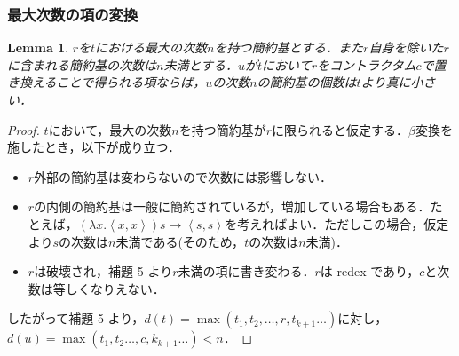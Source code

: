 \documentclass[a4paper,10pt,platex, dvipdfmx]{jsarticle}
\newtheorem{lemma}{Lemma}
\begin{document}
\subsubsection{最大次数の項の変換}
\begin{lemma}
$r$を$t$における最大の次数$n$を持つ簡約基とする．また$r$自身を除いた$r$に含まれる簡約基の次数は$n$未満とする．$u$が$t$において$r$をコントラクタム$c$で置き換えることで得られる項ならば，$u$の次数$n$の簡約基の個数は$t$より真に小さい．
\end{lemma}
\begin{proof}
    $t$において，最大の次数$n$を持つ簡約基が$r$に限られると仮定する．$\beta$変換を施したとき，以下が成り立つ．
    \begin{itemize}    
    \item $r$外部の簡約基は変わらないので次数には影響しない．
    \item $r$の内側の簡約基は一般に簡約されているが，増加している場合もある．たとえば，$(\lambda x. \left<x, x\right>) s \rightarrow \left<s, s\right>$を考えればよい．ただしこの場合，仮定より$s$の次数は$n$未満である(そのため，$t$の次数は$n$未満)．
    \item $r$は破壊され，補題 5 より$r$未満の項に書き変わる．$r$は redex であり，$c$と次数は等しくなりえない．
    \end{itemize}
    したがって補題 5 より，$d(t) = \max(t_{1},t_{2},\ldots ,r,t_{k+1}\ldots)$に対し， $d(u) = \max(t_{1},t_{2}\ldots,c,k_{k + 1}\ldots) < n$．
\end{proof}
\end{document}
